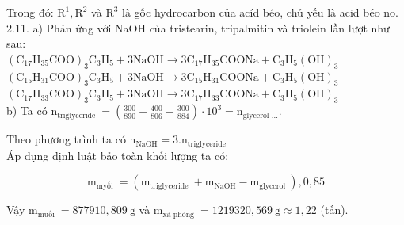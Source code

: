 \documentclass[10pt]{article}
\begin{document}
Trong đó: $\mathrm{R}^{1}, \mathrm{R}^{2}$ và $\mathrm{R}^{3}$ là gốc hydrocarbon của acíd béo, chủ yếu là acid béo no.\\
2.11. a) Phản ứng với NaOH của tristearin, tripalmitin và triolein lần lượt như sau:\\
$\left(\mathrm{C}_{17} \mathrm{H}_{35} \mathrm{COO}\right)_{3} \mathrm{C}_{3} \mathrm{H}_{5}+3 \mathrm{NaOH} \rightarrow 3 \mathrm{C}_{17} \mathrm{H}_{35} \mathrm{COONa}+\mathrm{C}_{3} \mathrm{H}_{5}(\mathrm{OH})_{3}$\\
$\left(\mathrm{C}_{15} \mathrm{H}_{31} \mathrm{COO}\right)_{3} \mathrm{C}_{3} \mathrm{H}_{5}+3 \mathrm{NaOH} \rightarrow 3 \mathrm{C}_{15} \mathrm{H}_{31} \mathrm{COONa}+\mathrm{C}_{3} \mathrm{H}_{5}(\mathrm{OH})_{3}$\\
$\left(\mathrm{C}_{17} \mathrm{H}_{33} \mathrm{COO}\right)_{3} \mathrm{C}_{3} \mathrm{H}_{5}+3 \mathrm{NaOH} \rightarrow 3 \mathrm{C}_{17} \mathrm{H}_{33} \mathrm{COONa}+\mathrm{C}_{3} \mathrm{H}_{5}(\mathrm{OH})_{3}$\\
b) Ta có $\mathrm{n}_{\text {triglyceride }}=\left(\frac{300}{890}+\frac{400}{806}+\frac{300}{884}\right) \cdot 10^{3}=\mathrm{n}_{\text {glycerol } \ldots}$.

Theo phương trình ta có $\mathrm{n}_{\mathrm{NaOH}}=3 . \mathrm{n}_{\text {triglyceride }}$\\
Áp dụng định luật bảo toàn khối lượng ta có:

$$
\mathrm{m}_{\text {myối }}=\left(\mathrm{m}_{\text {triglyceride }}+\mathrm{m}_{\mathrm{NaOH}}-\mathrm{m}_{\text {glyccrol }}\right), 0,85
$$

Vậy $\mathrm{m}_{\text {muối }}=877910,809 \mathrm{~g}$ và $\mathrm{m}_{\text {xà phòng }}=1219320,569 \mathrm{~g} \approx 1,22$ (tấn).
\end{document}
